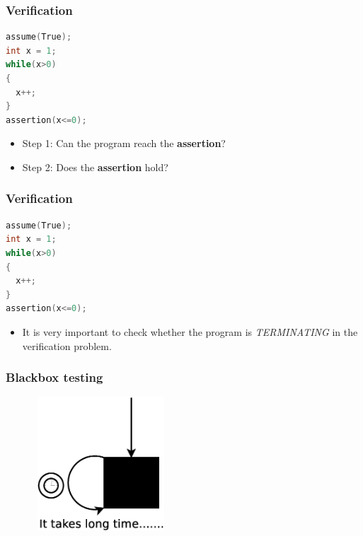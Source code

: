 \date{}

\frame{\titlepage}


\begin{frame}[fragile]
\frametitle{Verification}
\begin{minipage}{\linewidth}
\begin{lstlisting}[language=C++,
    xleftmargin=.3\textwidth, 
    xrightmargin=.3\textwidth]
assume(True);
int x = 1;
while(x>0)
{
  x++;
}
assertion(x<=0);
\end{lstlisting}
\end{minipage}
\vfill
\begin{minipage}{\linewidth}
\begin{itemize}
\item Step 1: Can the program reach the \textbf{assertion}?
\item Step 2: Does the \textbf{assertion} hold?
\end{itemize}
\end{minipage}

\end{frame}

\begin{frame}[fragile]
\frametitle{Verification}
\begin{minipage}{\linewidth}
\begin{lstlisting}[language=C++,
    xleftmargin=.3\textwidth, 
    xrightmargin=.3\textwidth]
assume(True);
int x = 1;
while(x>0)
{
  x++;
}
assertion(x<=0);
\end{lstlisting}
\end{minipage}
\vfill
\begin{minipage}{\linewidth}
\begin{itemize}
\item It is very important to check whether the program is \emph{\red TERMINATING} in the verification problem.
\end{itemize}
\end{minipage}

\end{frame}

\iffalse
\begin{frame}
\frametitle{Blackbox testing}
\begin{minipage}{\linewidth}
\begin{figure}  %
  \includegraphics[width=5cm,height = 5cm]{pictures/blackbox}  
\end{figure}
\end{minipage}
\vfill
\begin{minipage}{\linewidth}
\quad \\
\end{minipage}
\end{frame}

